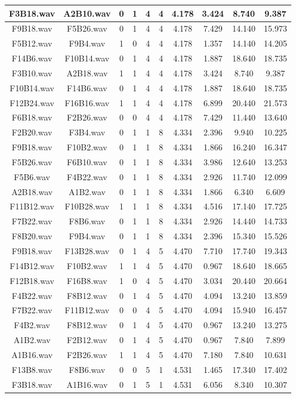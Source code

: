 \documentclass[11pt,a4paper]{book}
\begin{document}
\begin{longtable}[c]{|c|c|c|c|c|c|c|c|c|c|}
F3B18.wav&A2B10.wav&0&1&4&4&4.178&3.424&8.740&9.387\\ \hline
F9B18.wav&F5B26.wav&0&1&4&4&4.178&7.429&14.140&15.973\\ \hline
F5B12.wav&F9B4.wav&1&0&4&4&4.178&1.357&14.140&14.205\\ \hline
F14B6.wav&F10B14.wav&0&1&4&4&4.178&1.887&18.640&18.735\\ \hline
F3B10.wav&A2B18.wav&1&1&4&4&4.178&3.424&8.740&9.387\\ \hline
F10B14.wav&F14B6.wav&0&1&4&4&4.178&1.887&18.640&18.735\\ \hline
F12B24.wav&F16B16.wav&1&1&4&4&4.178&6.899&20.440&21.573\\ \hline
F6B18.wav&F2B26.wav&0&0&4&4&4.178&7.429&11.440&13.640\\ \hline
F2B20.wav&F3B4.wav&0&1&1&8&4.334&2.396&9.940&10.225\\ \hline
F9B18.wav&F10B2.wav&0&1&1&8&4.334&1.866&16.240&16.347\\ \hline
F5B26.wav&F6B10.wav&0&1&1&8&4.334&3.986&12.640&13.253\\ \hline
F5B6.wav&F4B22.wav&0&1&1&8&4.334&2.926&11.740&12.099\\ \hline
A2B18.wav&A1B2.wav&0&1&1&8&4.334&1.866&6.340&6.609\\ \hline
F11B12.wav&F10B28.wav&1&1&1&8&4.334&4.516&17.140&17.725\\ \hline
F7B22.wav&F8B6.wav&0&1&1&8&4.334&2.926&14.440&14.733\\ \hline
F8B20.wav&F9B4.wav&0&1&1&8&4.334&2.396&15.340&15.526\\ \hline
F9B18.wav&F13B28.wav&0&1&4&5&4.470&7.710&17.740&19.343\\ \hline
F14B12.wav&F10B2.wav&1&1&4&5&4.470&0.967&18.640&18.665\\ \hline
F12B18.wav&F16B8.wav&1&0&4&5&4.470&3.034&20.440&20.664\\ \hline
F4B22.wav&F8B12.wav&0&1&4&5&4.470&4.094&13.240&13.859\\ \hline
F7B22.wav&F11B12.wav&0&0&4&5&4.470&4.094&15.940&16.457\\ \hline
F4B2.wav&F8B12.wav&0&1&4&5&4.470&0.967&13.240&13.275\\ \hline
A1B2.wav&F2B12.wav&0&1&4&5&4.470&0.967&7.840&7.899\\ \hline
A1B16.wav&F2B26.wav&1&1&4&5&4.470&7.180&7.840&10.631\\ \hline
F13B8.wav&F8B6.wav&0&0&5&1&4.531&1.465&17.340&17.402\\ \hline
F3B18.wav&A1B16.wav&0&1&5&1&4.531&6.056&8.340&10.307\\ \hline

\end{longtable}
\end{document}
